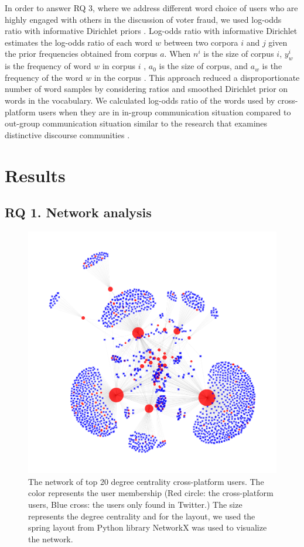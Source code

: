 \documentclass[Crown,sagev,times]{sagej}
\begin{document}
In order to answer RQ 3, where we address different word choice of users 
who are highly engaged with others in the discussion of voter fraud, 
we used log-odds ratio with informative Dirichlet priors \cite{monroe2008fightin}. 
Log-odds ratio with informative Dirichlet estimates the log-odds ratio 
of each word $w$ between two corpora $i$ and $j$ given the prior frequencies 
obtained from corpus $a$. When $n^i$ is the size of corpus $i$, $y_w^i$ 
is the frequency of word $w$ in corpus $i$ , $a_0$ is the size of corpus, 
and $a_w$ is the frequency of the word $w$ in the corpus \cite{kwak2020systematic}. 
This approach reduced a disproportionate number of word samples by 
considering ratios and smoothed Dirichlet prior on words in the vocabulary. 
We calculated log-odds ratio of the words used by cross-platform users 
when they are in in-group communication situation compared to out-group communication situation 
similar to the research that examines distinctive discourse communities \cite{park2023quantitative}.

\section{Results}

\subsection{RQ 1. Network analysis} \label{sec:network}

\begin{figure}[htp]
  \centering
  \includegraphics[width=12cm]{figure/RQ3rr_shape.pdf}
  \caption{The network of top 20 degree centrality cross-platform users.
  The color represents the user membership 
  (Red circle: the cross-platform users, Blue cross: the users only found in Twitter.) 
  The size represents the degree centrality and for the layout, we used the spring layout from Python library NetworkX was used to visualize the network.} 
  \label{fig: network analysis}
\end{figure}
\end{document}
